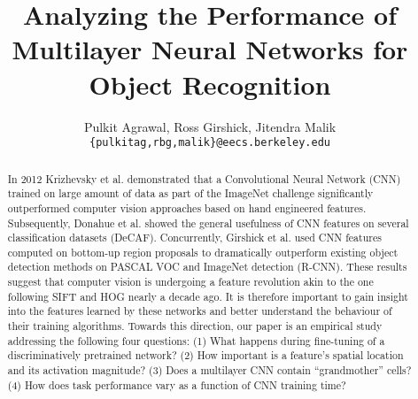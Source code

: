 \documentclass[runningheads]{llncs}
\begin{document}
\pagestyle{headings}
\mainmatter
\title{Analyzing the Performance of Multilayer Neural Networks for Object Recognition} %




\author{Pulkit Agrawal, Ross Girshick, Jitendra Malik\\
\texttt{\{pulkitag,rbg,malik\}@eecs.berkeley.edu}}


\maketitle

\begin{abstract}
In 2012 Krizhevsky et al. demonstrated that a Convolutional Neural Network (CNN) trained on large amount of data as part of the ImageNet challenge significantly outperformed computer vision approaches based on hand engineered features. Subsequently, Donahue et al. showed the general usefulness of CNN features on several classification datasets (DeCAF). Concurrently, Girshick et al. used CNN features computed on bottom-up region proposals to dramatically outperform existing object detection methods on PASCAL VOC and ImageNet detection (R-CNN). These results suggest that computer vision is undergoing a feature revolution akin to the one following SIFT and HOG nearly a decade ago. It is therefore important to gain insight into the features learned by these networks and better understand the behaviour of their training algorithms. Towards this direction, our paper is an empirical study addressing the following four questions: 
(1) What happens during fine-tuning of a discriminatively pretrained network? 
(2) How important is a feature's spatial location and its activation magnitude?
(3) Does a multilayer CNN contain ``grandmother'' cells?
(4) How does task performance vary as a function of CNN training time?

\end{abstract}
\end{document}
